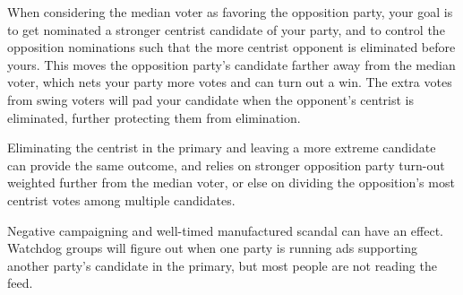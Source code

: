 When considering the median voter as favoring the opposition party, your goal is to get nominated a stronger centrist candidate of your party, and to control the opposition nominations such that the more centrist opponent is eliminated before yours.  This moves the opposition party's candidate farther away from the median voter, which nets your party more votes and can turn out a win.  The extra votes from swing voters will pad your candidate when the opponent's centrist is eliminated, further protecting them from elimination.

Eliminating the centrist in the primary and leaving a more extreme candidate can provide the same outcome, and relies on stronger opposition party turn-out weighted further from the median voter, or else on dividing the opposition's most centrist votes among multiple candidates.

Negative campaigning and well-timed manufactured scandal can have an effect.  Watchdog groups will figure out when one party is running ads supporting another party's candidate in the primary, but most people are not reading the feed.